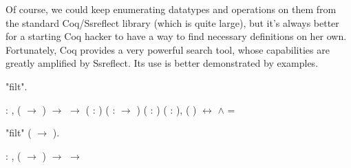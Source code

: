 Of course, we could keep enumerating datatypes and operations on them
from the standard Coq/Ssreflect library (which is quite large), but
it's always better for a starting Coq hacker to have a way to find
necessary definitions on her own. Fortunately, Coq provides a very
powerful search tool, whose capabilities are greatly amplified by
Ssreflect. Its use is better demonstrated by examples.


\begin{coqdoccode}
\coqdocemptyline
\coqdocnoindent
{} "filt".\coqdoceol
\end{coqdoccode}


\coqdoceol
\coqdocemptyline
\coqdocnoindent
{}  \coqdockw{\ensuremath{\forall}}  : , ( \ensuremath{\rightarrow} ) \ensuremath{\rightarrow}   \ensuremath{\rightarrow}  \coqdoceol
\coqdocnoindent
{}\coqdoceol
\coqdocindent{1.50em}
\coqdockw{\ensuremath{\forall}} ( : ) ( :  \ensuremath{\rightarrow} ) ( : ) ( :  ),\coqdoceol
\coqdocindent{1.50em}
  (  ) \ensuremath{\leftrightarrow}    \ensuremath{\land}   = 

\coqdocemptyline
\begin{coqdoccode}
\coqdocemptyline
\coqdocnoindent
{} "filt" (\coqdocvar{\_} \ensuremath{\rightarrow}  \coqdocvar{\_}).\coqdoceol
\end{coqdoccode}


\coqdoceol
\coqdocemptyline
\coqdocnoindent
{}  \coqdockw{\ensuremath{\forall}}  : , ( \ensuremath{\rightarrow} ) \ensuremath{\rightarrow}   \ensuremath{\rightarrow}  

\coqdocemptyline


